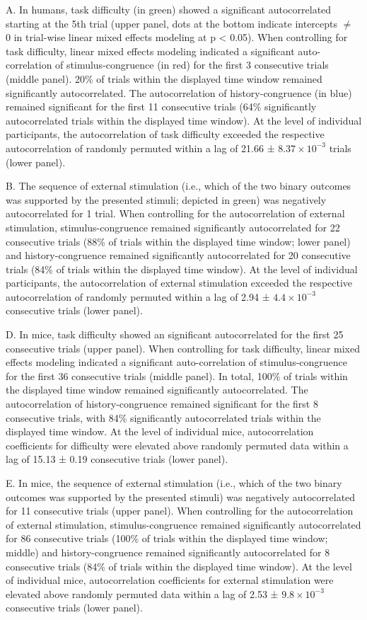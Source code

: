 \documentclass[
]{article}
\begin{document}
A. In humans, task difficulty (in green) showed a significant
autocorrelated starting at the 5th trial (upper panel, dots at the
bottom indicate intercepts \(\neq\) 0 in trial-wise linear mixed effects
modeling at p \textless{} 0.05). When controlling for task difficulty,
linear mixed effects modeling indicated a significant auto-correlation
of stimulus-congruence (in red) for the first 3 consecutive trials
(middle panel). 20\% of trials within the displayed time window remained
significantly autocorrelated. The autocorrelation of history-congruence
(in blue) remained significant for the first 11 consecutive trials (64\%
significantly autocorrelated trials within the displayed time window).
At the level of individual participants, the autocorrelation of task
difficulty exceeded the respective autocorrelation of randomly permuted
within a lag of 21.66 ± \ensuremath{8.37\times 10^{-3}} trials (lower
panel).

B. The sequence of external stimulation (i.e., which of the two binary
outcomes was supported by the presented stimuli; depicted in green) was
negatively autocorrelated for 1 trial. When controlling for the
autocorrelation of external stimulation, stimulus-congruence remained
significantly autocorrelated for 22 consecutive trials (88\% of trials
within the displayed time window; lower panel) and history-congruence
remained significantly autocorrelated for 20 consecutive trials (84\% of
trials within the displayed time window). At the level of individual
participants, the autocorrelation of external stimulation exceeded the
respective autocorrelation of randomly permuted within a lag of 2.94 ±
\ensuremath{4.4\times 10^{-3}} consecutive trials (lower panel).

D. In mice, task difficulty showed an significant autocorrelated for the
first 25 consecutive trials (upper panel). When controlling for task
difficulty, linear mixed effects modeling indicated a significant
auto-correlation of stimulus-congruence for the first 36 consecutive
trials (middle panel). In total, 100\% of trials within the displayed
time window remained significantly autocorrelated. The autocorrelation
of history-congruence remained significant for the first 8 consecutive
trials, with 84\% significantly autocorrelated trials within the
displayed time window. At the level of individual mice, autocorrelation
coefficients for difficulty were elevated above randomly permuted data
within a lag of 15.13 ± 0.19 consecutive trials (lower panel).

E. In mice, the sequence of external stimulation (i.e., which of the two
binary outcomes was supported by the presented stimuli) was negatively
autocorrelated for 11 consecutive trials (upper panel). When controlling
for the autocorrelation of external stimulation, stimulus-congruence
remained significantly autocorrelated for 86 consecutive trials (100\%
of trials within the displayed time window; middle) and
history-congruence remained significantly autocorrelated for 8
consecutive trials (84\% of trials within the displayed time window). At
the level of individual mice, autocorrelation coefficients for external
stimulation were elevated above randomly permuted data within a lag of
2.53 ± \ensuremath{9.8\times 10^{-3}} consecutive trials (lower panel).
\end{document}

